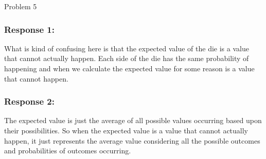 \begin{problem}{Problem 5}
\begin{highlight}[Solution]
        \subsubsection*{Response 1:}

        What is kind of confusing here is that the expected value of the die is a value that cannot actually happen. Each side of the die has the same probability of happening and when we calculate the
        expected value for some reason is a value that cannot happen. \vspace*{1em}

        \subsubsection*{Response 2:}

        The expected value is just the average of all possible values occurring based upon their possibilities. So when the expected value is a value that cannot actually happen, it just represents 
        the average value considering all the possible outcomes and probabilities of outcomes occurring.
    \end{highlight}
\end{problem}

